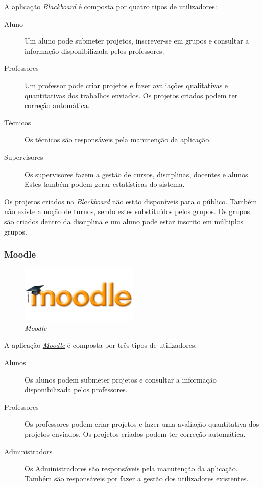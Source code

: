 A aplicação \href{http://www.blackboard.com}{\emph{Blackboard}} é composta por quatro tipos de utilizadores:
\begin{description}
	\item[Aluno] Um aluno pode submeter projetos, inscrever-se em grupos e consultar a informação disponibilizada pelos professores.
	\item[Professores] Um professor pode criar projetos e fazer avaliações qualitativas e quantitativas dos trabalhos enviados. Os projetos criados podem ter correção automática.
	\item[Técnicos] Os técnicos são responsáveis pela manutenção da aplicação.
	\item[Supervisores] Os supervisores fazem a gestão de cursos, disciplinas, docentes e alunos. Estes também podem gerar estatísticas do sistema.
\end{description}

Os projetos criados na \emph{Blackboard} não estão disponíveis para o público. Também não existe a noção de turnos, sendo estes substituídos pelos grupos. Os grupos são criados dentro da disciplina e um aluno pode estar inscrito em múltiplos grupos.

\subsubsection{Moodle} %
\label{ssub:moodle}
\begin{figure}[H]
        \centering
        \includegraphics[width=0.5\textwidth]{images/concorrencia/moodle.jpg}
         \caption{\emph{Moodle}}
         \label{fig: moodle}
\end{figure}
A aplicação \href{http://www.moodle.org}{\emph{Moodle}} é composta por três tipos de utilizadores:

\begin{description}
	\item[Alunos] Os alunos podem submeter projetos e consultar a informação disponibilizada pelos professores.
	\item[Professores] Os professores podem criar projetos e fazer uma avaliação quantitativa dos projetos enviados. Os projetos criados podem ter correção automática.
	\item[Administradors] Os Administradores são responsáveis pela manutenção da aplicação. Também são responsáveis por fazer a gestão dos utilizadores existentes.
\end{description}


